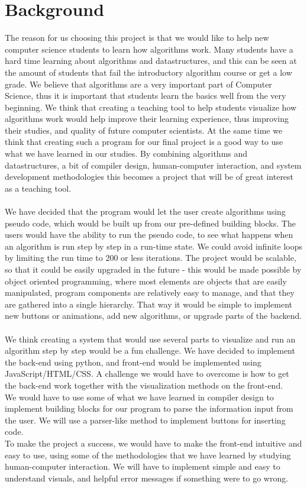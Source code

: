 \documentclass[11pt]{article}
\begin{document}
\section*{Background}
The reason for us choosing this project is that we would like to help new computer science students to learn how algorithms work. Many students have a hard time learning about algorithms and datastructures, and this can be seen at the amount of students that fail the introductory algorithm course or get a low grade. We believe that algorithms are a very important part of Computer Science, thus it is important that students learn the basics well from the very beginning. We think that creating a teaching tool to help students visualize how algorithms work would help improve their learning experience, thus improving their studies, and quality of future computer scientists. At the same time we think that creating such a program for our final project is a good way to use what we have learned in our studies. By combining algorithms and datastructures, a bit of compiler design, human-computer interaction, and system development methodologies this becomes a project that will be of great interest as a teaching tool.
\\\\
We have decided that the program would let the user create algorithms using pseudo code, which would be built up from our pre-defined building blocks. The users would have the ability to run the pseudo code, to see what happens when an algorithm is run step by step in a run-time state. We could avoid infinite loops by limiting the run time to 200 or less iterations. The project would be scalable, so that it could be easily upgraded in the future - this would be made possible by object oriented programming, where most elements are objects that are easily manipulated, program components are relatively easy to manage, and that they are gathered into a single hierarchy. That way it would be simple to implement new buttons or animations, add new algorithms, or upgrade parts of the backend.
\\\\
We think creating a system that would use several parts to visualize and run an algorithm step by step would be a fun challenge. We have decided to implement the back-end using python, and front-end would be implemented using JavaScript/HTML/CSS. A challenge we would have to overcome is how to get the back-end work together with the visualization methods on the front-end.\\
We would have to use some of what we have learned in compiler design to implement building blocks for our program to parse the information input from the user. We will use a parser-like method to implement buttons for inserting code.\\
To make the project a success, we would have to make the front-end intuitive and easy to use, using some of the methodologies that we have learned by studying human-computer interaction. We will have to implement simple and easy to understand visuals, and helpful error messages if something were to go wrong.\\
\end{document}

